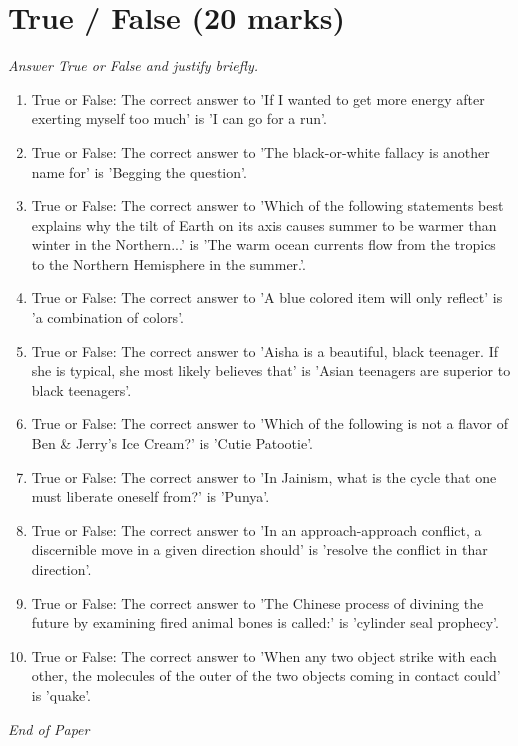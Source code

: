 \documentclass[12pt]{article}
\begin{document}
\section*{True / False (20 marks)}
\textit{Answer True or False and justify briefly.}
\begin{enumerate}[label=\arabic*.]
\item True or False: The correct answer to 'If I wanted to get more energy after exerting myself too much' is 'I can go for a run'.
\item True or False: The correct answer to 'The black-or-white fallacy is another name for' is 'Begging the question'.
\item True or False: The correct answer to 'Which of the following statements best explains why the tilt of Earth on its axis causes summer to be warmer than winter in the Northern...' is 'The warm ocean currents flow from the tropics to the Northern Hemisphere in the summer.'.
\item True or False: The correct answer to 'A blue colored item will only reflect' is 'a combination of colors'.
\item True or False: The correct answer to 'Aisha is a beautiful, black teenager. If she is typical, she most likely believes that' is 'Asian teenagers are superior to black teenagers'.
\item True or False: The correct answer to 'Which of the following is not a flavor of Ben \& Jerry's Ice Cream?' is 'Cutie Patootie'.
\item True or False: The correct answer to 'In Jainism, what is the cycle that one must liberate oneself from?' is 'Punya'.
\item True or False: The correct answer to 'In an approach-approach conflict, a discernible move in a given direction should' is 'resolve the conflict in thar direction'.
\item True or False: The correct answer to 'The Chinese process of divining the future by examining fired animal bones is called:' is 'cylinder seal prophecy'.
\item True or False: The correct answer to 'When any two object strike with each other, the molecules of the outer of the two objects coming in contact could' is 'quake'.
\end{enumerate}

\vfill
\noindent\textit{End of Paper}
\end{document}
